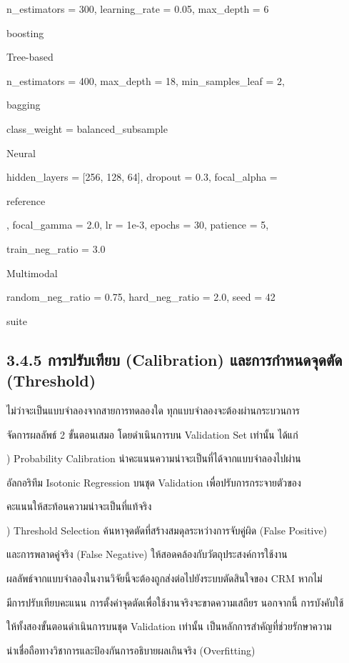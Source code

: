 \documentclass[12pt,a4paper]{report}
\begin{document}
n\_estimators = 300, learning\_rate = 0.05, max\_depth = 6\par
boosting\par
Tree-based\par
n\_estimators = 400, max\_depth = 18, min\_samples\_leaf = 2,\par
bagging\par
class\_weight = balanced\_subsample\par
Neural\par
hidden\_layers = [256, 128, 64], dropout = 0.3, focal\_alpha =\par
reference\par
{}, focal\_gamma = 2.0, lr = 1e-3, epochs = 30, patience = 5,\par
train\_neg\_ratio = 3.0\par
Multimodal\par
random\_neg\_ratio = 0.75, hard\_neg\_ratio = 2.0, seed = 42\par
suite\par
\clearpage
\subsection*{3.4.5 การปรับเทียบ (Calibration) และการกำหนดจุดตัด (Threshold)}
ไม่ว่าจะเป็นแบบจำลองจากสายการทดลองใด ทุกแบบจำลองจะต้องผ่านกระบวนการ\par
จัดการผลลัพธ์ 2 ขั้นตอนเสมอ โดยดำเนินการบน Validation Set เท่านั้น ได้แก่\par
{}) Probability Calibration นำคะแนนความน่าจะเป็นที่ได้จากแบบจำลองไปผ่าน\par
อัลกอริทึม Isotonic Regression บนชุด Validation เพื่อปรับการกระจายตัวของ\par
คะแนนให้สะท้อนความน่าจะเป็นที่แท้จริง\par
{}) Threshold Selection ค้นหาจุดตัดที่สร้างสมดุลระหว่างการจับคู่ผิด (False Positive)\par
และการพลาดคู่จริง (False Negative) ให้สอดคล้องกับวัตถุประสงค์การใช้งาน\par
ผลลัพธ์จากแบบจำลองในงานวิจัยนี้จะต้องถูกส่งต่อไปยังระบบตัดสินใจของ CRM หากไม่\par
มีการปรับเทียบคะแนน การตั้งค่าจุดตัดเพื่อใช้งานจริงจะขาดความเสถียร นอกจากนี้ การบังคับใช้\par
ให้ทั้งสองขั้นตอนดำเนินการบนชุด Validation เท่านั้น เป็นหลักการสำคัญที่ช่วยรักษาความ\par
น่าเชื่อถือทางวิชาการและป้องกันการอธิบายผลเกินจริง (Overfitting)\par
\end{document}
